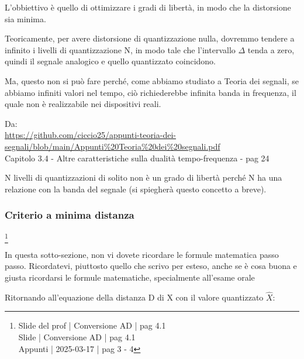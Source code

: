 L'obbiettivo è quello di ottimizzare i gradi di libertà, in modo che la distorsione sia minima. \newline 

Teoricamente, per avere distorsione di quantizzazione nulla, dovremmo tendere a infinito i livelli di quantizzazione N, 
in modo tale che l'intervallo $\Delta$ tenda a zero, quindi il segnale analogico e quello quantizzato coincidono. \newline 

Ma, questo non si può fare perché, come abbiamo studiato a Teoria dei segnali, se abbiamo infiniti valori nel tempo, ciò richiederebbe infinita banda in frequenza, 
il quale non è realizzabile nei dispositivi reali. \newline 

\begin{tcolorbox}
      Da: \\
    \url{https://github.com/ciccio25/appunti-teoria-dei-segnali/blob/main/Appunti%20Teoria%20dei%20segnali.pdf} \\
    Capitolo 3.4 - Altre caratteristiche sulla dualità tempo-frequenza - pag 24 \newline 

\end{tcolorbox}

N livelli di quantizzazioni di solito non è un grado di libertà perché N ha una relazione con la banda del segnale (si spiegherà questo concetto a breve). \newline 

\newpage 

\subsubsection{Criterio a minima distanza}
\footnote{Slide del prof | Conversione AD | pag 4.1 \\  
Slide | Conversione AD | pag 4.1\\
Appunti | 2025-03-17 | pag 3 - 4
}

\begin{tcolorbox}
In questa sotto-sezione, non vi dovete ricordare le formule matematica passo passo. \newline 
Ricordatevi, piuttosto quello che scrivo per esteso, anche se è cosa buona e giusta ricordarsi le formule matematiche, specialmente all'esame orale    
\end{tcolorbox}

Ritornando all'equazione della distanza D di X con il valore quantizzato $\hat{X}$: 

